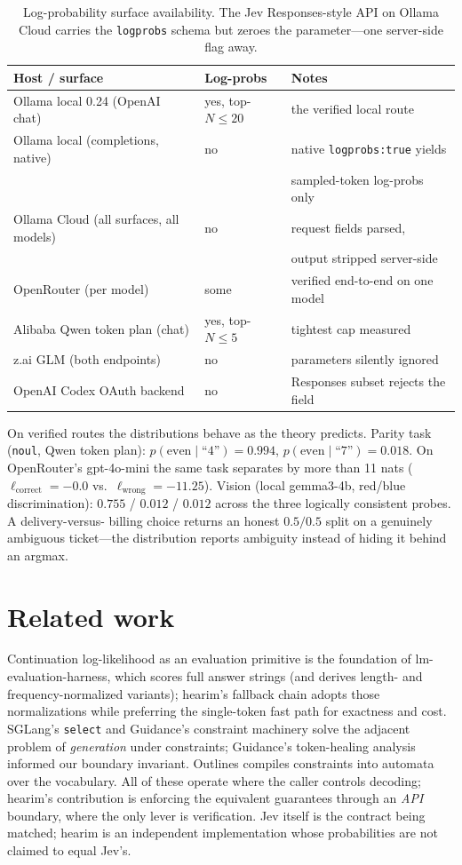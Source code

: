 \documentclass[11pt]{article}
\begin{document}
\begin{table}[h]
\centering
\begin{tabular}{lll}
\toprule
Host / surface & Log-probs & Notes \\
\midrule
Ollama local 0.24 (OpenAI chat) & yes, top-$N{\le}20$ & the verified local route \\
Ollama local (completions, native) & no & native \texttt{logprobs:true} yields \\
 & & sampled-token log-probs only \\
Ollama Cloud (all surfaces, all models) & no & request fields parsed, \\
 & & output stripped server-side \\
OpenRouter (per model) & some & verified end-to-end on one model \\
Alibaba Qwen token plan (chat) & yes, top-$N{\le}5$ & tightest cap measured \\
z.ai GLM (both endpoints) & no & parameters silently ignored \\
OpenAI Codex OAuth backend & no & Responses subset rejects the field \\
\bottomrule
\end{tabular}
\caption{Log-probability surface availability. The Jev Responses-style API
on Ollama Cloud carries the \texttt{logprobs} schema but zeroes the
parameter---one server-side flag away.}
\label{tab:surface}
\end{table}

On verified routes the distributions behave as the theory predicts.
Parity task (\texttt{noul}, Qwen token plan): $p(\text{even} \mid
\text{``4''}) = 0.994$, $p(\text{even} \mid \text{``7''}) = 0.018$. On
OpenRouter's gpt-4o-mini the same task separates by more than 11 nats
($\ell_{\text{correct}} = -0.0$ vs.\ $\ell_{\text{wrong}} = -11.25$).
Vision (local gemma3-4b, red/blue discrimination): $0.755$ / $0.012$ /
$0.012$ across the three logically consistent probes. A delivery-versus-
billing choice returns an honest $0.5/0.5$ split on a genuinely ambiguous
ticket---the distribution reports ambiguity instead of hiding it behind
an argmax.

\section{Related work}

Continuation log-likelihood as an evaluation primitive is the foundation
of lm-evaluation-harness, which scores full answer strings (and derives
length- and frequency-normalized variants); hearim's fallback chain
adopts those normalizations while preferring the single-token fast path
for exactness and cost. SGLang's \texttt{select} and Guidance's
constraint machinery solve the adjacent problem of \emph{generation} under
constraints; Guidance's token-healing analysis informed our boundary
invariant. Outlines compiles constraints into automata over the
vocabulary. All of these operate where the caller controls decoding;
hearim's contribution is enforcing the equivalent guarantees through an
\emph{API} boundary, where the only lever is verification. Jev itself is
the contract being matched; hearim is an independent implementation whose
probabilities are not claimed to equal Jev's.
\end{document}
